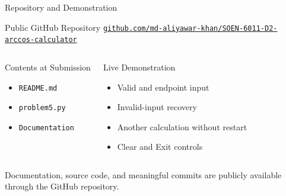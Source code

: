 \documentclass[aspectratio=169]{beamer}
\begin{document}
\begin{frame}{Repository and Demonstration}
\begin{block}{Public GitHub Repository}
\centering
\href{https://github.com/md-aliyawar-khan/SOEN-6011-D2-arccos-calculator}
{\color{blueaccent}\texttt{github.com/md-aliyawar-khan/SOEN-6011-D2-arccos-calculator}}
\end{block}

\vspace{0.20cm}

\begin{columns}[T,onlytextwidth]

\begin{block}{Contents at Submission}
\begin{itemize}
    \item \texttt{README.md}
    \item \texttt{problem5.py}
    \item  \texttt{Documentation}
\end{itemize}
\end{block}


\begin{exampleblock}{Live Demonstration}
\begin{itemize}
    \item Valid and endpoint input
    \item Invalid-input recovery
    \item Another calculation without restart
    \item Clear and Exit controls
\end{itemize}
\end{exampleblock}
\end{columns}

\vfill
\centering
{\color{midgray}\small Documentation, source code, and meaningful commits are publicly available through the GitHub repository.}
\end{frame}
\end{document}
